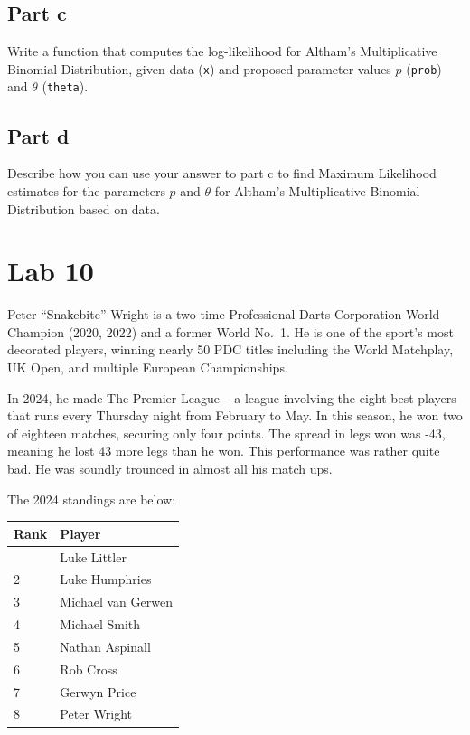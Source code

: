 \documentclass[
]{article}
\begin{document}
\subsection{Part c}\label{part-c-1}

Write a function that computes the log-likelihood for Altham's
Multiplicative Binomial Distribution, given data (\texttt{x}) and
proposed parameter values \(p\) (\texttt{prob}) and \(\theta\)
(\texttt{theta}).

\subsection{Part d}\label{part-d}

Describe how you can use your answer to part c to find Maximum
Likelihood estimates for the parameters \(p\) and \(\theta\) for
Altham's Multiplicative Binomial Distribution based on data.

\section{Lab 10}\label{lab-10}

Peter ``Snakebite'' Wright is a two-time Professional Darts Corporation
World Champion (2020, 2022) and a former World No.~1. He is one of the
sport's most decorated players, winning nearly 50 PDC titles including
the World Matchplay, UK Open, and multiple European Championships.

In 2024, he made The Premier League -- a league involving the eight best
players that runs every Thursday night from February to May. In this
season, he won two of eighteen matches, securing only four points. The
spread in legs won was -43, meaning he lost 43 more legs than he won.
This performance was rather quite bad. He was soundly trounced in almost
all his match ups.

The 2024 standings are below:

\begin{longtable}[]{@{}ll@{}}
\toprule\noalign{}
Rank & Player \\
\midrule\noalign{}
\endhead
\bottomrule\noalign{}
\endlastfoot
1 & Luke Littler \\
2 & Luke Humphries \\
3 & Michael van Gerwen \\
4 & Michael Smith \\
5 & Nathan Aspinall \\
6 & Rob Cross \\
7 & Gerwyn Price \\
8 & Peter Wright \\
\end{longtable}
\end{document}
